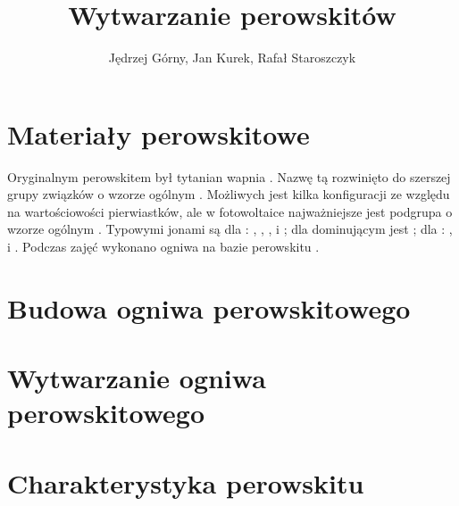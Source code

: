 \documentclass{article}
\title{Wytwarzanie perowskitów}
\author{Jędrzej Górny, Jan Kurek, Rafał Staroszczyk}
\date{}
\begin{document}
	\maketitle
	\section{Materiały perowskitowe}
	Oryginalnym perowskitem był tytanian wapnia . Nazwę tą rozwinięto do szerszej grupy związków o wzorze ogólnym . Możliwych jest kilka konfiguracji ze względu na wartościowości pierwiastków, ale w fotowoltaice najważniejsze jest podgrupa o wzorze ogólnym . Typowymi jonami są dla : , , ,  i ; dla  dominującym jest ; dla {: ,  i . Podczas zajęć wykonano ogniwa na bazie perowskitu }.
	\section{Budowa ogniwa perowskitowego}
	\section{Wytwarzanie ogniwa perowskitowego}
	\section{Charakterystyka perowskitu}
\end{document}
